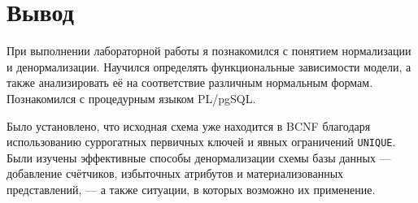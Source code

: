 \documentclass[12pt,a4paper]{article}
\begin{document}
\section{Вывод}

При выполнении лабораторной работы я познакомился с понятием нормализации
и денормализации. Научился определять функциональные зависимости модели,
а также анализировать её на соответствие различным нормальным формам.
Познакомился с процедурным языком PL/pgSQL.

Было установлено, что исходная схема уже находится в BCNF благодаря
использованию суррогатных первичных ключей и явных ограничений
\texttt{UNIQUE}. Были изучены эффективные способы денормализации схемы
базы данных --- добавление счётчиков, избыточных атрибутов и
материализованных представлений, --- а также ситуации, в которых
возможно их применение.
\end{document}
